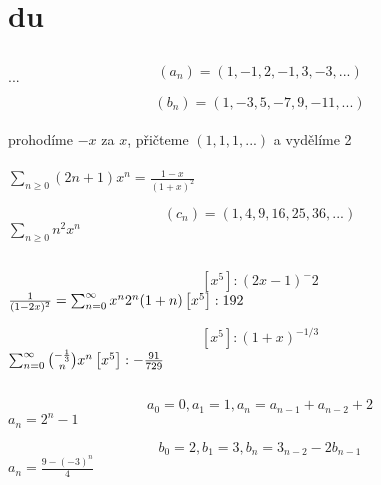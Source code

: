 \documentclass[a4paper]{article}
\begin{document}
\pagestyle{fancy}

\section{du}
\subsection{}

$$
(a_n) = (1, -1, 2, -1, 3, -3, ...)
$$
$
...
$

$$
(b_n) = (1, -3, 5, -7, 9, -11, ...)
$$
\\
prohodíme $-x$ za $x$, přičteme $(1, 1, 1, ...)$ a vydělíme 2
\\ \\
$
\sum_{n \geq 0}(2n + 1)x^n = 
\frac{1-x}{(1+x)^2}
$


$$
(c_n) = (1, 4, 9, 16, 25, 36, ...)
$$
$
\sum_{n \geq 0} n^2 x^n 
$

\subsection{}
$$
[x^5] : (2x - 1)^-2
$$
$
\frac{1}{(1-2x)^2}=
\sum_{n=0}^\infty x^n 2^n (1+n)
\\ \\
\left[ x^5 \right] : 192
$

$$
[x^5] : (1 + x)^{-1/3}
$$
$
\sum_{n=0}^\infty \binom{-\frac{1}{3}}{n} x^n
\\ \\
\left[ x^5 \right] : -\frac{91}{729}
$


\subsection{}
$$
a_0 = 0, a_1 = 1, a_n = a_{n-1} + a_{n-2} + 2
$$
$
a_n = 2^n -1
$

$$
b_0 = 2, b_1 = 3, b_n = 3_{n-2} - 2b_{n-1}
$$
$
a_n = \frac{9-(-3)^n}{4}
$
\end{document}

